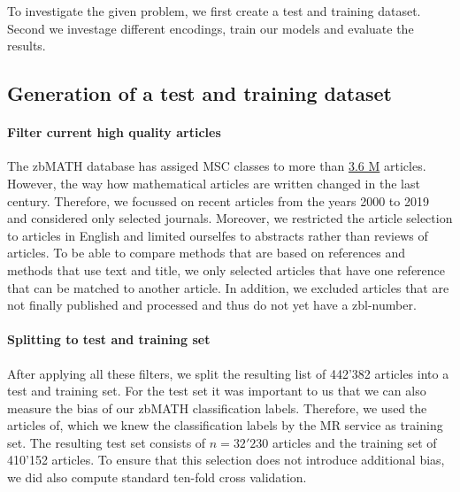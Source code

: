 To investigate the given problem, we first create a test and training dataset.
Second we investage different encodings, train our models and evaluate the results.
\subsection{Generation of a test and training dataset}
\paragraph{Filter current high quality articles}
The zbMATH database has assiged MSC classes to more than
\href{https://zbmath.org/?q=cc%3A*}%
{3.6 M} articles.
However, the way how mathematical articles are written changed in the last century.
Therefore, we focussed on recent articles from the years 2000 to 2019 and considered only selected journals.
Moreover, we restricted the article selection to articles in English and limited ourselfes to abstracts rather than reviews of articles.
To be able to compare methods that are based on references and methods that use text and title, we only selected articles that have one reference that
can be matched to another article.
In addition, we excluded articles that are not finally published and processed and thus do not yet have a zbl-number.
\paragraph{Splitting to test and training set}
After applying all these filters, we split the resulting list of 442'382 articles into a test and training set.
For the test set it was important to us that we can also measure the bias of our zbMATH classification labels.
Therefore, we used the articles of, which we knew the classification labels by the MR service as training set.
The resulting test set consists of $n=32'230$ articles and the training set of 410'152 articles.
To ensure that this selection does not introduce additional bias, we did also compute standard ten-fold cross validation.
